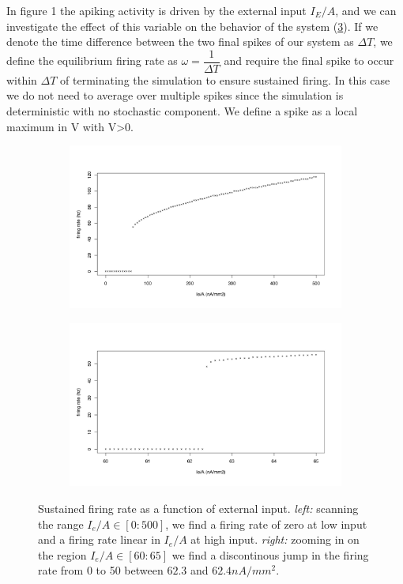 \documentclass{article}
\begin{document}
In figure 1 the apiking activity is driven by the external input $I_E/A$, and we can investigate the effect of this variable on the behavior of the system (\ref{fig:rates}). If we denote the time difference between the two final spikes of our system as $\Delta T$, we define the equilibrium firing rate as $\omega = \dfrac{1}{\Delta T}$ and require the final spike to occur within $\Delta T$ of terminating the simulation to ensure sustained firing.
In this case we do not need to average over multiple spikes since the simulation is deterministic with no stochastic component. We define a spike as a local maximum in V with V>0.

\begin{figure}[h]
\begin{subfigure}[t]{0.48\linewidth}
	\centering
	\includegraphics[width = 1.0\linewidth, trim={20 30 40 70}, clip=true]{firing_rates.png}
	\label{fig:bigrates}	
\end{subfigure}
\hspace{0.02\linewidth}
\begin{subfigure}[t]{0.48\linewidth}
	\centering
	\includegraphics[width = 1.0\linewidth, trim={20 30 40 70}, clip=true]{firing_rates_finegrained.png}
	\label{fig:smallrates}	
\end{subfigure}
\label{fig:rates}
\caption{Sustained firing rate as a function of external input. \textit{left:} scanning the range $I_e/A \in [0:500]$, we find a firing rate of zero at low input and a firing rate linear in $I_e/A$ at high input. \textit{right:} zooming in on the region $I_e/A \in [60:65]$ we find a discontinous jump in the firing rate from 0 to 50 between $62.3$ and $62.4 nA/mm^2$. }
\end{figure}
\end{document}
